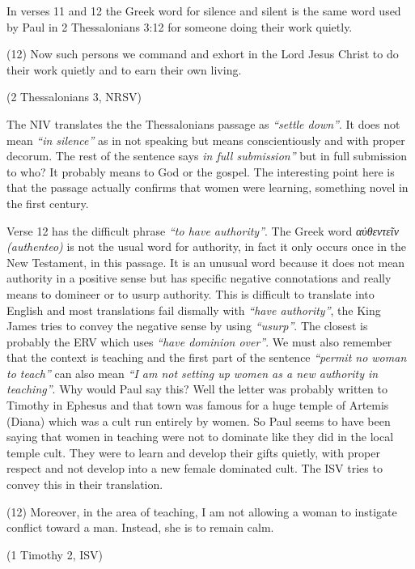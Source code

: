 \documentclass[a5paper, openany, oneside, pagesize,
headings=standardclasses, chapterprefix=false]{scrbook}
\begin{document}
In verses 11 and 12 the Greek word for silence and silent is the same
word used by Paul in 2 Thessalonians 3:12 for someone doing their work
quietly. 

\begin{myquote}
(12) Now such persons we command and exhort in the Lord Jesus Christ to do their work quietly and to earn their own living.

(2 Thessalonians 3, NRSV)
\end{myquote}

The NIV translates the the Thessalonians passage as
\emph{``settle down''}. It does not mean \emph{``in silence''} as in
not speaking but means conscientiously and
with proper decorum. The rest of the sentence says \emph{in full
  submission''} but in full submission to who? It probably means to
God or the gospel. The interesting point here is that the passage
actually confirms that women were learning, something novel in the
first century.

Verse 12 has the difficult phrase \emph{``to have authority''}. The
Greek word \emph{αὐθεντεῖν (authenteo)} is not the usual word for
authority, in fact it only occurs once in the New Testament, in this passage. It is an
unusual word because it does not mean authority in a positive sense
but has specific negative connotations and really means to domineer or
to usurp authority.
This is difficult to translate into English and most translations fail
dismally with \emph{``have authority''}, the King James tries to
convey the negative sense by using \emph{``usurp''}. The closest is probably the ERV which uses
\emph{``have dominion over''}. We must also remember that the context
is teaching and the first part of the sentence \emph{``permit no woman
  to teach''} can also mean \emph{``I am not setting up women as a new
  authority in teaching''}. Why would Paul say this? Well the letter
was probably written to Timothy in Ephesus and that town was famous for
a huge temple of Artemis (Diana) which was a cult run entirely by
women. So Paul seems to have been saying that women in teaching were not
to dominate like they did in the local temple cult. They were to learn
and develop their gifts quietly, with proper respect and not develop
into a new female dominated cult. The ISV tries to convey this in
their translation.

\begin{myquote}
(12) Moreover, in the area of teaching, I am not allowing a woman to instigate conflict toward a man. Instead, she is to remain calm.

(1 Timothy 2, ISV)
\end{myquote}
\end{document}
